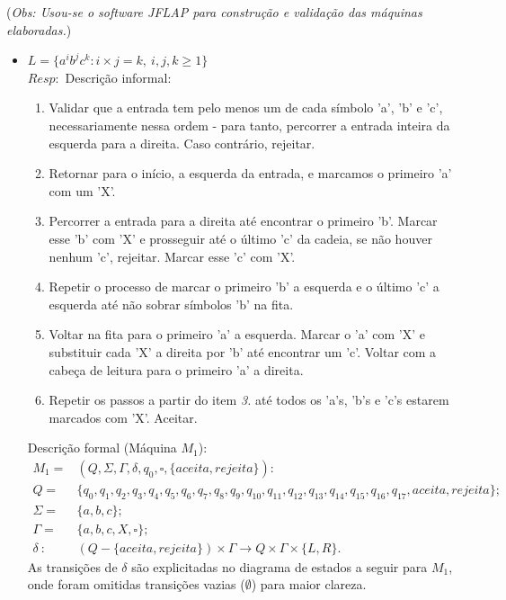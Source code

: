 \documentclass{homework}
\begin{document}
\pagebreak

(\textit{Obs: Usou-se o software JFLAP para construção e validação das máquinas elaboradas.})
	\begin{itemize}
		\item $L = \{a^ib^jc^k: i \times j = k,\ i,j,k \geq 1\}$\\
		$Resp:$ Descrição informal:
		\begin{enumerate}
			\item Validar que a entrada tem pelo menos um de cada símbolo 'a', 'b' e 'c', necessariamente nessa ordem - para tanto, percorrer a entrada inteira da esquerda para a direita. Caso contrário, rejeitar.
			\item Retornar para o início, a esquerda da entrada, e marcamos o primeiro 'a' com um 'X'.
			\item Percorrer a entrada para a direita até encontrar o primeiro 'b'. Marcar esse 'b' com 'X' e prosseguir até o último 'c' da cadeia, se não houver nenhum 'c', rejeitar. Marcar esse 'c' com 'X'.
			\item Repetir o processo de marcar o primeiro 'b' a esquerda e o último 'c' a esquerda até não sobrar símbolos 'b' na fita.
			\item Voltar na fita para o primeiro 'a' a esquerda. Marcar o 'a' com 'X' e substituir cada 'X' a direita por 'b' até encontrar um 'c'. Voltar com a cabeça de leitura para o primeiro 'a' a direita.
			\item Repetir os passos a partir do item \textit{3.} até todos os 'a's, 'b's e 'c's estarem marcados com 'X'. Aceitar.
		\end{enumerate}
		\quad Descrição formal (Máquina $M_1$):
		\begin{align*}
			M_1 = & (Q,\Sigma, \Gamma, \delta, q_0, \square, \{aceita,rejeita\}):\\
			Q = & \{q_0,q_1,q_2,q_3,q_4,q_5,q_6,q_7,q_8,q_9,q_{10},
			q_{11},q_{12},q_{13},q_{14},q_{15},
			q_{16},q_{17},aceita,rejeita\};\\
			\Sigma = & \{a,b,c\};\\
			\Gamma = & \{a,b,c,X,\square\};\\
			\delta\ :\ & (Q - \{aceita,rejeita\}) \times \Gamma \rightarrow Q \times \Gamma \times \{L,R\}.
		\end{align*}
		As transições de $\delta$ são explicitadas no diagrama de estados a seguir para $M_1$, onde foram omitidas transições vazias ($\emptyset$) para maior clareza.\\

\end{itemize}
\end{document}
